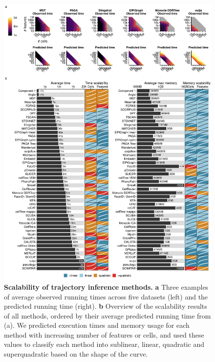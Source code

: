 \begin{figure}[tbh!]
	\centering\includegraphics[width=0.9\linewidth]{fig/supfigure_4.pdf}
	\caption{
		\textbf{Scalability of trajectory inference methods.}
		\textbf{a} Three examples of average observed running times across five datasets (left) and the predicted running time (right). \textbf{b} Overview of the scalability results of all methods, ordered by their average predicted running time from (a). We predicted execution times and memory usage for each method with increasing number of features or cells, and used these values to classify each method into sublinear, linear, quadratic and superquadratic based on the shape of the curve.
	}
	\label{fig:supfigure_4}
\end{figure}


